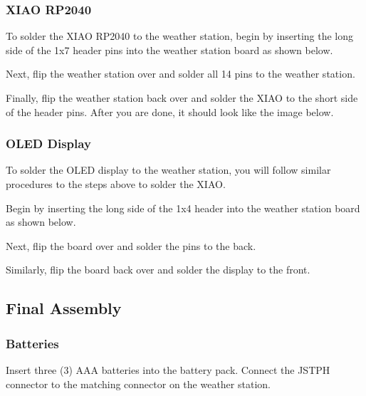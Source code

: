 \documentclass[letterpaper,10pt,english]{sphinxmanual}
\begin{document}
\subsubsection{XIAO RP2040}
\label{\detokenize{hardware/assembly:xiao-rp2040}}\label{\detokenize{hardware/assembly:id2}}
\sphinxAtStartPar
To solder the XIAO RP2040 to the weather station, begin by inserting the long side of the 1x7 header pins into the weather station board as shown below.


\sphinxAtStartPar
Next, flip the weather station over and solder all 14 pins to the weather station.

\sphinxAtStartPar
Finally, flip the weather station back over and solder the XIAO to the short side of the header pins. After you are done, it should look like the image below.



\subsubsection{OLED Display}
\label{\detokenize{hardware/assembly:oled-display}}\label{\detokenize{hardware/assembly:id3}}
\sphinxAtStartPar
To solder the OLED display to the weather station, you will follow similar procedures to the steps above to solder the XIAO.

\sphinxAtStartPar
Begin by inserting the long side of the 1x4 header into the weather station board as shown below.


\sphinxAtStartPar
Next, flip the board over and solder the pins to the back.

\sphinxAtStartPar
Similarly, flip the board back over and solder the display to the front.



\subsection{Final Assembly}
\label{\detokenize{hardware/assembly:final-assembly}}


\subsubsection{Batteries}
\label{\detokenize{hardware/assembly:batteries}}\label{\detokenize{hardware/assembly:id4}}
\sphinxAtStartPar
Insert three (3) AAA batteries into the battery pack. Connect the JST\sphinxhyphen{}PH connector to the matching connector on the weather station.
\end{document}
